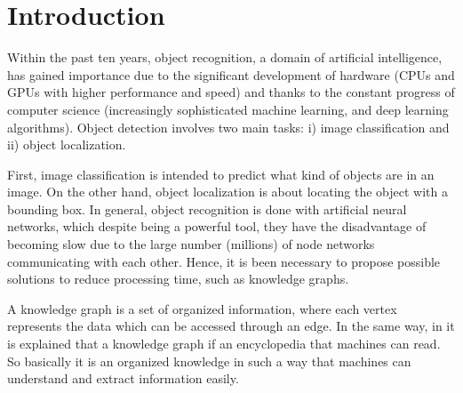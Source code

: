 \section{Introduction}
Within the past ten years, object recognition, a domain of artificial 
intelligence, has gained importance due to the significant development of 
hardware (CPUs and GPUs with higher performance and speed) and thanks to the 
constant progress of computer science (increasingly sophisticated machine 
learning, and deep learning algorithms). Object detection involves two main 
tasks: i) image classification and ii) object localization.

First, image classification is intended to predict what kind of objects are in 
an image. On the other hand, object localization is about locating the object 
with a bounding box. In general, object recognition is done with artificial 
neural networks, which despite being a powerful tool, they have the disadvantage 
of becoming slow due to the large number (millions) of node networks 
communicating with each other. Hence, it is been necessary to propose possible 
solutions to reduce processing time, such as knowledge graphs.

A knowledge graph is a set of organized information, where each vertex 
represents the data which can be accessed through an edge. In the same way, 
in \cite{Barnard} it is explained that a knowledge graph if an encyclopedia 
that machines can read. So basically it is an organized knowledge in such a 
way that machines can understand and extract information easily.

